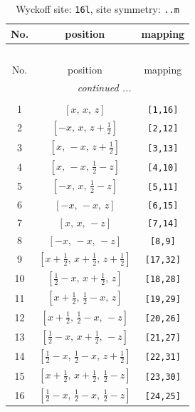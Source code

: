 \documentclass[fleqn,8pt]{jsarticle}
\begin{document}
\renewcommand{\arraystretch}{1.2}
\begin{longtable}{ccc}
\caption{Wyckoff site: {\tt 16l}, site symmetry: {\tt ..m}}
 \\
 \hline \hline
No. & position & mapping \\ \hline \endfirsthead

\multicolumn{2}{l}{\tablename\ \thetable{}} \\
 \hline \hline
No. & position & mapping \\ \hline \endhead

 \hline \hline
\multicolumn{2}{r}{\footnotesize\it continued ...} \\ \endfoot

 \hline \hline
\multicolumn{2}{r}{} \\ \endlastfoot

1 & $\left[ x,\, x,\, z \right]$ & {\tt [1,16]} \\ \hline
2 & $\left[ - x,\, x,\, z + \frac{1}{2} \right]$ & {\tt [2,12]} \\ \hline
3 & $\left[ x,\, - x,\, z + \frac{1}{2} \right]$ & {\tt [3,13]} \\ \hline
4 & $\left[ x,\, - x,\, \frac{1}{2} - z \right]$ & {\tt [4,10]} \\ \hline
5 & $\left[ - x,\, x,\, \frac{1}{2} - z \right]$ & {\tt [5,11]} \\ \hline
6 & $\left[ - x,\, - x,\, z \right]$ & {\tt [6,15]} \\ \hline
7 & $\left[ x,\, x,\, - z \right]$ & {\tt [7,14]} \\ \hline
8 & $\left[ - x,\, - x,\, - z \right]$ & {\tt [8,9]} \\ \hline
9 & $\left[ x + \frac{1}{2},\, x + \frac{1}{2},\, z + \frac{1}{2} \right]$ & {\tt [17,32]} \\ \hline
10 & $\left[ \frac{1}{2} - x,\, x + \frac{1}{2},\, z \right]$ & {\tt [18,28]} \\ \hline
11 & $\left[ x + \frac{1}{2},\, \frac{1}{2} - x,\, z \right]$ & {\tt [19,29]} \\ \hline
12 & $\left[ x + \frac{1}{2},\, \frac{1}{2} - x,\, - z \right]$ & {\tt [20,26]} \\ \hline
13 & $\left[ \frac{1}{2} - x,\, x + \frac{1}{2},\, - z \right]$ & {\tt [21,27]} \\ \hline
14 & $\left[ \frac{1}{2} - x,\, \frac{1}{2} - x,\, z + \frac{1}{2} \right]$ & {\tt [22,31]} \\ \hline
15 & $\left[ x + \frac{1}{2},\, x + \frac{1}{2},\, \frac{1}{2} - z \right]$ & {\tt [23,30]} \\ \hline
16 & $\left[ \frac{1}{2} - x,\, \frac{1}{2} - x,\, \frac{1}{2} - z \right]$ & {\tt [24,25]} \\
\end{longtable}
\end{document}
